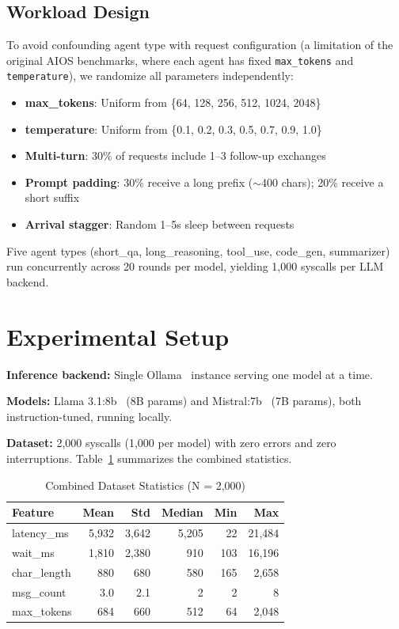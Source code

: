 \documentclass[conference]{IEEEtran}
\begin{document}
\subsection{Workload Design}
To avoid confounding agent type with request configuration (a limitation of the original AIOS benchmarks, where each agent has fixed \texttt{max\_tokens} and \texttt{temperature}), we randomize all parameters independently:

\begin{itemize}
    \item \textbf{max\_tokens}: Uniform from \{64, 128, 256, 512, 1024, 2048\}
    \item \textbf{temperature}: Uniform from \{0.1, 0.2, 0.3, 0.5, 0.7, 0.9, 1.0\}
    \item \textbf{Multi-turn}: 30\% of requests include 1--3 follow-up exchanges
    \item \textbf{Prompt padding}: 30\% receive a long prefix ($\sim$400 chars); 20\% receive a short suffix
    \item \textbf{Arrival stagger}: Random 1--5s sleep between requests
\end{itemize}

Five agent types (short\_qa, long\_reasoning, tool\_use, code\_gen, summarizer) run concurrently across 20 rounds per model, yielding 1,000 syscalls per LLM backend.

\section{Experimental Setup}

\textbf{Inference backend:} Single Ollama~\cite{ollama} instance serving one model at a time.

\textbf{Models:} Llama 3.1:8b~\cite{dubey2024llama} (8B params) and Mistral:7b~\cite{jiang2023mistral} (7B params), both instruction-tuned, running locally.

\textbf{Dataset:} 2,000 syscalls (1,000 per model) with zero errors and zero interruptions. Table~\ref{tab:dataset} summarizes the combined statistics.

\begin{table}[htbp]
\caption{Combined Dataset Statistics (N = 2,000)}
\begin{center}
\begin{tabular}{lrrrrr}
\toprule
\textbf{Feature} & \textbf{Mean} & \textbf{Std} & \textbf{Median} & \textbf{Min} & \textbf{Max} \\
\midrule
latency\_ms & 5,932 & 3,642 & 5,205 & 22 & 21,484 \\
wait\_ms & 1,810 & 2,380 & 910 & 103 & 16,196 \\
char\_length & 880 & 680 & 580 & 165 & 2,658 \\
msg\_count & 3.0 & 2.1 & 2 & 2 & 8 \\
max\_tokens & 684 & 660 & 512 & 64 & 2,048 \\
\bottomrule
\end{tabular}
\label{tab:dataset}
\end{center}
\end{table}
\end{document}
